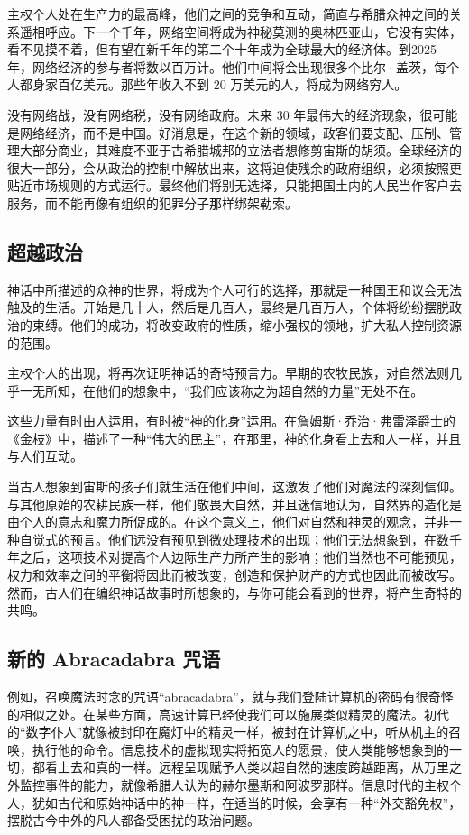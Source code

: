 主权个人处在生产力的最高峰，他们之间的竞争和互动，简直与希腊众神之间的关系遥相呼应。下一个千年，网络空间将成为神秘莫测的奥林匹亚山，它没有实体，看不见摸不着，但有望在新千年的第二个十年成为全球最大的经济体。到2025 年，网络经济的参与者将数以百万计。他们中间将会出现很多个比尔·盖茨，每个人都身家百亿美元。那些年收入不到 20 万美元的人，将成为网络穷人。


没有网络战，没有网络税，没有网络政府。未来 30 年最伟大的经济现象，很可能是网络经济，而不是中国。好消息是，在这个新的领域，政客们要支配、压制、管理大部分商业，其难度不亚于古希腊城邦的立法者想修剪宙斯的胡须。全球经济的很大一部分，会从政治的控制中解放出来，这将迫使残余的政府组织，必须按照更贴近市场规则的方式运行。最终他们将别无选择，只能把国土内的人民当作客户去服务，而不能再像有组织的犯罪分子那样绑架勒索。



\subsection{超越政治}
神话中所描述的众神的世界，将成为个人可行的选择，那就是一种国王和议会无法触及的生活。开始是几十人，然后是几百人，最终是几百万人，个体将纷纷摆脱政治的束缚。他们的成功，将改变政府的性质，缩小强权的领地，扩大私人控制资源的范围。


主权个人的出现，将再次证明神话的奇特预言力。早期的农牧民族，对自然法则几乎一无所知，在他们的想象中，“我们应该称之为超自然的力量”无处不在。


这些力量有时由人运用，有时被“神的化身”运用。在詹姆斯·乔治·弗雷泽爵士的《金枝》中，描述了一种“伟大的民主”，在那里，神的化身看上去和人一样，并且与人们互动。


当古人想象到宙斯的孩子们就生活在他们中间，这激发了他们对魔法的深刻信仰。与其他原始的农耕民族一样，他们敬畏大自然，并且迷信地认为，自然界的造化是由个人的意志和魔力所促成的。在这个意义上，他们对自然和神灵的观念，并非一种自觉式的预言。他们远没有预见到微处理技术的出现；他们无法想象到，在数千年之后，这项技术对提高个人边际生产力所产生的影响；他们当然也不可能预见，权力和效率之间的平衡将因此而被改变，创造和保护财产的方式也因此而被改写。然而，古人们在编织神话故事时所想象的，与你可能会看到的世界，将产生奇特的共鸣。



\subsection{新的 Abracadabra 咒语}
例如，召唤魔法时念的咒语“abracadabra”，就与我们登陆计算机的密码有很奇怪的相似之处。在某些方面，高速计算已经使我们可以施展类似精灵的魔法。初代的“数字仆人”就像被封印在魔灯中的精灵一样，被封在计算机之中，听从机主的召唤，执行他的命令。信息技术的虚拟现实将拓宽人的愿景，使人类能够想象到的一切，都看上去和真的一样。远程呈现赋予人类以超自然的速度跨越距离，从万里之外监控事件的能力，就像希腊人认为的赫尔墨斯和阿波罗那样。信息时代的主权个人，犹如古代和原始神话中的神一样，在适当的时候，会享有一种“外交豁免权”，摆脱古今中外的凡人都备受困扰的政治问题。


